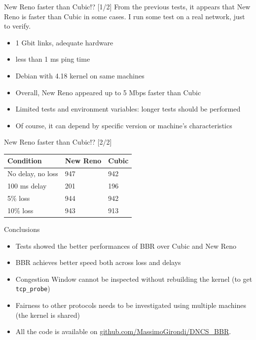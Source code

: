 \documentclass[13pt,aspectratio=43]{beamer}
\begin{document}
\begin{frame}{New Reno faster than Cubic!? [1/2]}
	From the previous tests, it appears that New Reno is faster than Cubic in some cases.
	I run some test on a real network, just to verify.
	\begin{itemize}
		\item 1 Gbit links, adequate hardware
		\item less than 1 ms ping time
		\item Debian with 4.18 kernel on same machines
		\item Overall, New Reno appeared up to 5 Mbps faster than Cubic
		\item Limited tests and environment variables: longer tests should be performed
		\item Of course, it can depend by specific version or machine's characteristics
	\end{itemize}
\end{frame}

\begin{frame}{New Reno faster than Cubic!? [2/2]}
\begin{table}[]
\begin{tabular}{l|l|l}
\textbf{Condition} & \textbf{New Reno} & \textbf{Cubic} \\ \hline
No delay, no loss  & 947               & 942            \\
100 ms delay       & 201               & 196            \\
5\% loss           & 944               & 942            \\
10\% loss          & 943               & 913           
\end{tabular}
\end{table}
\end{frame}

\begin{frame}{Conclusions}
	\begin{itemize}
		\item Tests showed the better performances of BBR over Cubic and New Reno
		\item BBR achieves better speed both across loss and delays
		\item Congestion Window cannot be inspected without rebuilding the kernel (to get \texttt{tcp\_probe})
		\item Fairness to other protocols needs to be investigated using multiple machines (the kernel is shared)
        \item All the code is available on \url{github.com/MassimoGirondi/DNCS_BBR}.
	\end{itemize}
\end{frame}
\end{document}
